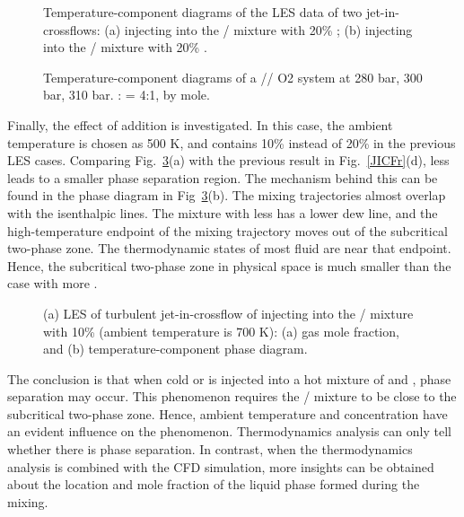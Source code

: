 \begin{figure}[htb]
    \centering
    \caption{Temperature-component diagrams of the LES data of two jet-in-crossflows: (a) injecting  into the / mixture with 20\% ; (b) injecting  into the / mixture with 20\% .}
    \label{JICFT}
\end{figure}

\begin{figure}[htb]
    \centering
    \caption{Temperature-component diagrams of a //\ce
    {O2} system at 280 bar, 300 bar, 310 bar. : = 4:1, by mole.}
    \label{JICFTX}
\end{figure}

Finally, the effect of  addition is investigated. In this case, the ambient temperature is chosen as 500 K, and  contains 10\%  instead of 20\% in the previous LES cases. Comparing Fig.~\ref{JICFH}(a) with the previous result in Fig.~\ref{JICFr}(d), less  leads to a smaller phase separation region. The mechanism behind this can be found in the phase diagram in Fig~\ref{JICFH}(b). The mixing trajectories almost overlap with the isenthalpic lines. The mixture  with less  has a lower dew line, and the high-temperature endpoint of the mixing trajectory moves out of the subcritical two-phase zone. The thermodynamic states of most fluid are near that endpoint. Hence, the subcritical two-phase zone in physical space is much smaller than the case with more .
\begin{figure}[htb]
    \centering
    \caption{(a) LES of turbulent jet-in-crossflow of injecting  into the / mixture with 10\%  (ambient temperature is 700 K): (a) gas mole fraction, and (b) temperature-component phase diagram.}
    \label{JICFH}
\end{figure}

The conclusion is that when cold  or  is injected into a hot mixture of  and , phase separation may occur. This phenomenon requires the / mixture to be close to the subcritical two-phase zone. %
Hence, ambient temperature and  concentration have an evident influence on the phenomenon. Thermodynamics analysis can only tell whether there is phase separation. In contrast, when the thermodynamics analysis is combined with the CFD simulation, more insights can be obtained about the location and mole fraction of the liquid phase formed during the mixing.



